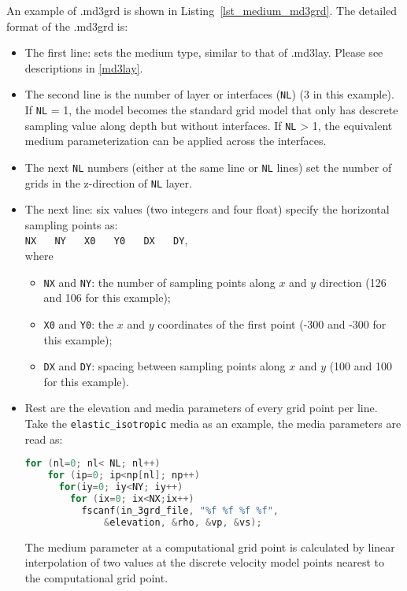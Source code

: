 An example of .md3grd is shown in Listing~\ref{lst_medium_md3grd}. %
The detailed format of the .md3grd is:
\begin{itemize}
  \item The first line: sets the medium type, similar to that of .md3lay. 
     Please see descriptions in \ref{md3lay}.

   \item The second line is the number of layer or interfaces (\texttt{NL}) (3 in this example).
     If \texttt{NL} = 1, the model becomes the standard grid model that
     only has descrete sampling value along depth but without interfaces.
     If \texttt{NL} > 1, the equivalent medium parameterization can be applied across the interfaces.

   \item The next \texttt{NL} numbers (either at the same line or \texttt{NL} lines)
     set the number of grids in the z-direction of \texttt{NL} layer.
  
   \item The next line:
      six values (two integers and four float) specify the horizontal sampling points as:\\
      \texttt{NX} ~~ \texttt{NY} ~~ \texttt{X0} ~~ \texttt{Y0} ~~ \texttt{DX} ~~ \texttt{DY}, \\
      where
      \begin{itemize}
        \item \texttt{NX} and \texttt{NY}:
            the number of sampling points along $x$ and $y$ direction (126 and 106 for this example);
        \item \texttt{X0} and \texttt{Y0}: 
          the $x$ and $y$ coordinates of the first point (-300 and -300 for this example);
        \item \texttt{DX} and \texttt{DY}:
          spacing between sampling points along $x$ and $y$ (100 and 100 for this example).
      \end{itemize}

  \item Rest are the elevation and media parameters of every grid point per line.
    Take the \texttt{elastic\_isotropic} media as an example,
    the media parameters are read as:
  \begin{lstlisting}[language = C]
  for (nl=0; nl< NL; nl++)
    for (ip=0; ip<np[nl]; np++)
      for(iy=0; iy<NY; iy++)
        for (ix=0; ix<NX;ix++)
          fscanf(in_3grd_file, "%f %f %f %f", 
              &elevation, &rho, &vp, &vs);
  \end{lstlisting}
  The medium parameter at a computational grid point is calculated
    by linear interpolation of two values at the discrete velocity model points
    nearest to the computational grid point.

\end{itemize}


